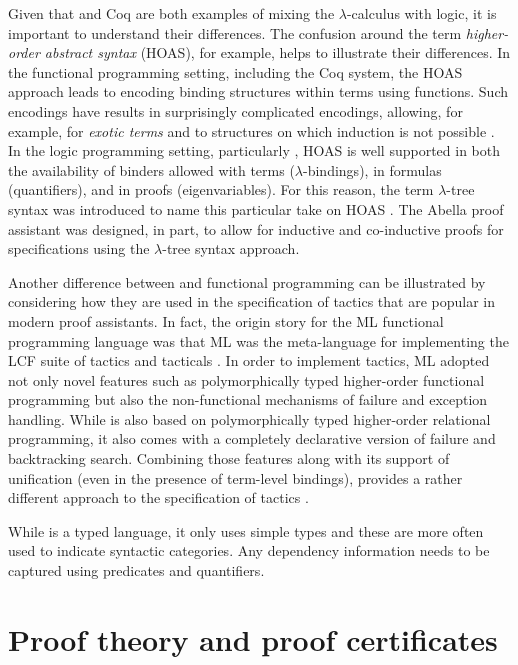\documentclass[a4paper,USenglish,cleveref, autoref, thm-restate]{lipics-v2019}
\begin{document}
Given that \lP and Coq are both examples of mixing the
$\lambda$-calculus with logic, it is important to understand their
differences.  The confusion around the term \emph{higher-order
abstract syntax} (HOAS), for example, helps to illustrate their
differences.  In the functional programming setting, including the Coq
system, the HOAS approach leads to encoding binding structures within
terms using functions.  Such encodings have results in surprisingly
complicated encodings, allowing, for example, for \emph{exotic terms}
\cite{despeyroux95tlca} and to structures on which induction is not
possible \cite{roeckl01fossacs}.  In the logic programming setting,
particularly \lP, HOAS is well supported in both the availability of
binders allowed with terms ($\lambda$-bindings), in formulas
(quantifiers), and in proofs (eigenvariables).  For this reason, the
term $\lambda$-tree syntax was introduced to name this particular take
on HOAS \cite{miller19jar}.  The Abella proof assistant
\cite{baelde14jfr} was designed, in part, to allow for inductive and
co-inductive proofs for specifications using the $\lambda$-tree syntax
approach.

Another difference between \lP and functional programming can be
illustrated by considering how they are used in the specification of
tactics that are popular in modern proof assistants.  In fact, the
origin story for the ML functional programming language was that ML
was the meta-language for implementing the LCF suite of tactics and
tacticals \cite{gordon79}.  In order to implement tactics, ML adopted
not only novel features such as polymorphically typed higher-order
functional programming but also the non-functional mechanisms of
failure and exception handling.  While \lP is also based on
polymorphically typed higher-order relational programming, it also
comes with a completely declarative version of failure and
backtracking search.  Combining those features along with its support
of unification (even in the presence of term-level bindings), \lP
provides a rather different approach to the specification of tactics
\cite{felty93jar}.

While \lP is a typed language, it only uses simple types and these are
more often used to indicate syntactic categories.  Any dependency
information needs to be captured using predicates and quantifiers. 


\section{Proof theory and proof certificates}
\end{document}
